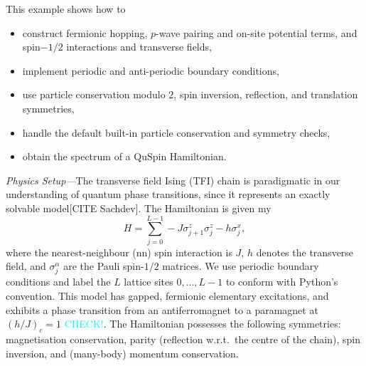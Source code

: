 \documentclass{SciPost}
\newcommand\0{\scalebox{-1}[1]{0}}
\newcommand*{\cyan}{\textcolor{cyan}}
\begin{document}
This example shows how to
\begin{itemize}
	\item construct fermionic hopping, $p$-wave pairing and on-site potential terms, and spin$-1/2$ interactions and transverse fields,
	\item implement periodic and anti-periodic boundary conditions,
	\item use particle conservation modulo $2$, spin inversion, reflection, and translation symmetries,
	\item handle the default built-in particle conservation and symmetry checks,
	\item obtain the spectrum of a QuSpin Hamiltonian.
\end{itemize}

\noindent\emph{Physics Setup---}The transverse field Ising (TFI) chain is paradigmatic in our understanding of quantum phase transitions, since it represents an exactly solvable model[CITE Sachdev]. The Hamiltonian is given my
\begin{equation}
H=\sum_{j=0}^{L-1}-J\sigma^z_{j+1}\sigma^z_j - h\sigma^x_j,
\label{eq:TFIM}
\end{equation} 
where the nearest-neighbour (nn) spin interaction is $J$, $h$ denotes the transverse field, and $\sigma^\alpha_j$ are the Pauli spin-$1/2$ matrices. We use periodic boundary conditions and label the $L$ lattice sites $0,\dots,L-1$ to conform with Python's convention. This model has gapped, fermionic elementary excitations, and exhibits a phase transition from an antiferromagnet to a paramagnet at $\left(h/J\right)_c=1$ \cyan{CHECK!}. The Hamiltonian possesses the following symmetries: magnetisation conservation, parity (reflection w.r.t.~the centre of the chain), spin inversion, and (many-body) momentum conservation.
\end{document}
